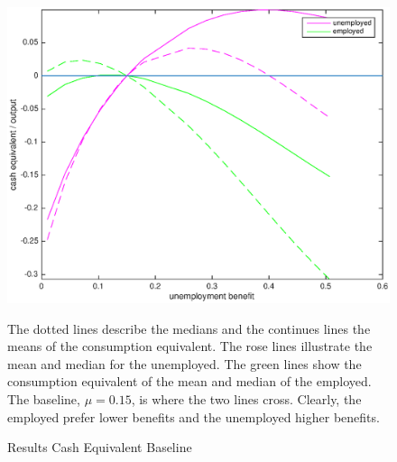 \documentclass[a4paper,12pt]{article}
\begin{document}
\begin{figure}
\caption{Results Cash Equivalent Baseline } 
\label{baseline_ue_vs_e}	%
\centering
\includegraphics[scale=.5]{Cash_equivalent_baseline}  %

\begin{minipage}{0.8\linewidth}
\footnotesize{The dotted lines describe the medians and the continues lines the means of the consumption equivalent. The rose lines illustrate the mean and median for the unemployed. The green lines show the consumption equivalent of the mean and median of the employed. The baseline, $\mu = 0.15$, is where the two lines cross. Clearly, the employed prefer lower benefits and the unemployed higher benefits. }
\end{minipage}

\end{figure}
\end{document}

